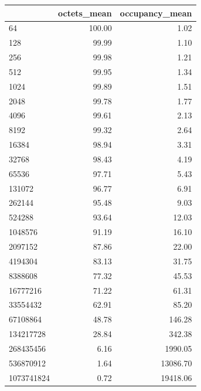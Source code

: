 \begin{tabular}{lrr}
\toprule
 & octets_mean & occupancy_mean \\
\midrule
64 & 100.00 & 1.02 \\
128 & 99.99 & 1.10 \\
256 & 99.98 & 1.21 \\
512 & 99.95 & 1.34 \\
1024 & 99.89 & 1.51 \\
2048 & 99.78 & 1.77 \\
4096 & 99.61 & 2.13 \\
8192 & 99.32 & 2.64 \\
16384 & 98.94 & 3.31 \\
32768 & 98.43 & 4.19 \\
65536 & 97.71 & 5.43 \\
131072 & 96.77 & 6.91 \\
262144 & 95.48 & 9.03 \\
524288 & 93.64 & 12.03 \\
1048576 & 91.19 & 16.10 \\
2097152 & 87.86 & 22.00 \\
4194304 & 83.13 & 31.75 \\
8388608 & 77.32 & 45.53 \\
16777216 & 71.22 & 61.31 \\
33554432 & 62.91 & 85.20 \\
67108864 & 48.78 & 146.28 \\
134217728 & 28.84 & 342.38 \\
268435456 & 6.16 & 1990.05 \\
536870912 & 1.64 & 13086.70 \\
1073741824 & 0.72 & 19418.06 \\
\bottomrule
\end{tabular}
